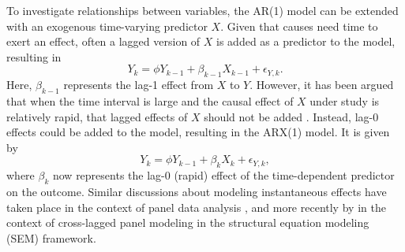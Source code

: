 \documentclass[man]{apa7} %
\begin{document}
To investigate relationships between variables, the AR(1) model can be extended with an exogenous time-varying predictor $X$. Given that causes need time to exert an effect, often a lagged version of $X$ is added as a predictor to the model, resulting in 
\begin{equation}
    Y_{k} = \phi Y_{k - 1} + \beta_{k - 1} X_{k - 1} + \epsilon_{Y,k}. 
\end{equation}
Here, $\beta_{k - 1}$ represents the lag-1 effect from $X$ to $Y$. However, it has been argued that when the time interval is large and the causal effect of $X$ under study is relatively rapid, that lagged effects of $X$ should not be added \parencite{mundlak_aggregation_1961}. Instead, lag-0 effects could be added to the model, resulting in the ARX(1) model. It is given by
\begin{equation} \label{eq:ARX1}
    Y_{k} = \phi Y_{k - 1} + \beta_{k} X_{k} + \epsilon_{Y,k}, 
\end{equation}
where $\beta_{k}$ now represents the lag-0 (rapid) effect of the time-dependent predictor on the outcome. Similar discussions about modeling instantaneous effects have taken place in the context of panel data analysis \parencite{greenberg_panel_1979, greenberg_equilibrium_1982}, and more recently by \textcite{muthen_can_2024} in the context of cross-lagged panel modeling in the structural equation modeling (SEM) framework. 
\end{document}
